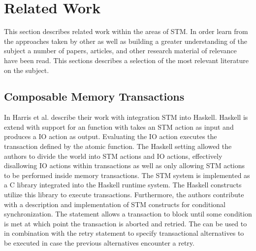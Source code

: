 \section{Related Work}
This section describes related work within the areas of \ac{STM}. In order learn from the approaches taken by other as well as building a greater understanding of the subject a number of papers, articles, and other research material of relevance have been read. This sections describes a selection of the most relevant literature on the subject.

\subsection{Composable Memory Transactions}
In \cite{harris2005composable} Harris et al. describe their work with integration \ac{STM} into Haskell. Haskell is extend with support for an  function with takes an \ac{STM} action as input and produces a \ac{IO} action as output\cite[p. 51]{harris2005composable}. Evaluating the IO action executes the transaction defined by the atomic function. The Haskell setting allowed the authors to divide the world into \ac{STM} actions and \ac{IO} actions\cite[p. 51]{harris2005composable}, effectively disallowing \ac{IO} actions within transactions as well as only allowing \ac{STM} actions to be performed inside memory transactions. The \ac{STM} system is implemented as a C library integrated into the Haskell runtime system. The Haskell constructs utilize this library to execute transactions\cite[p. 56]{harris2005composable}. Furthermore, the authors contribute with a description and implementation of \ac{STM} constructs for conditional synchronization. The  statement allows a transaction to block until some condition is met at which point the transaction is aborted and retried\cite[p. 52]{harris2005composable}. The  can be used to in combination with the retry statement to specify transactional alternatives to be executed in case the previous alternatives encounter a retry\cite[p. 52]{harris2005composable}.

